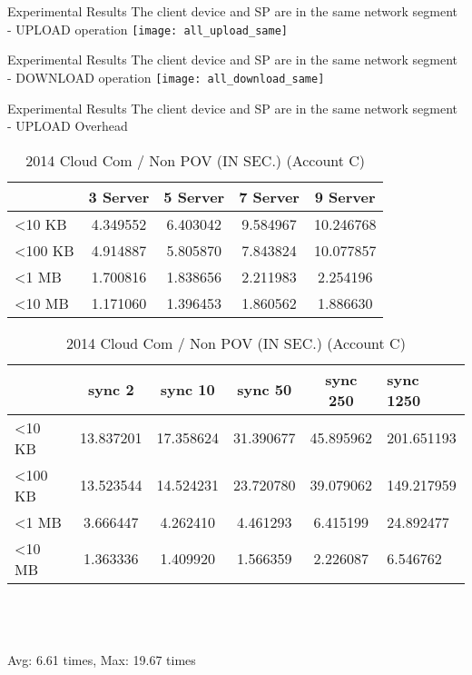 \begin{frame}{Experimental Results}
{The client device and SP are in the same network segment - UPLOAD operation}
	\texttt{[image: all\_upload\_same]}
\end{frame}

\begin{frame}{Experimental Results}
{The client device and SP are in the same network segment - DOWNLOAD operation}
	\texttt{[image: all\_download\_same]}
\end{frame}

\begin{frame}{Experimental Results}
{The client device and SP are in the same network segment - UPLOAD Overhead}
	\scriptsize
    \begin{table}[]
    \centering
    \caption{My Method / Non POV (IN SEC.) (Account C)}
    \begin{tabular}{lcccc}
                         & 3 Server & 5 Server & 7 Server & 9 Server  \\ \hline
        \textless 10 KB  & 4.349552 & 6.403042 & 9.584967 & 10.246768 \\ \hline
        \textless 100 KB & 4.914887 & 5.805870 & 7.843824 & 10.077857 \\ \hline
        \textless 1 MB   & 1.700816 & 1.838656 & 2.211983 & 2.254196  \\ \hline
        \textless 10 MB  & 1.171060 & 1.396453 & 1.860562 & 1.886630  \\ \hline
    \end{tabular}
    \caption{2014 Cloud Com / Non POV (IN SEC.) (Account C)}
    \begin{tabular}{lccccl}
                         & sync 2    & sync 10   & sync 50   & sync 250  & sync 1250  \\ \hline
        \textless 10 KB  & 13.837201 & 17.358624 & 31.390677 & 45.895962 & 201.651193 \\ \hline
        \textless 100 KB & 13.523544 & 14.524231 & 23.720780 & 39.079062 & 149.217959 \\ \hline
        \textless 1 MB   & 3.666447  & 4.262410  & 4.461293  & 6.415199  & 24.892477  \\ \hline
        \textless 10 MB  & 1.363336  & 1.409920  & 1.566359  & 2.226087  & 6.546762   \\ \hline
    \end{tabular}
    ~\\
    ~\\
    ~\\
    \alert{Avg: 6.61 times, Max: 19.67 times}
    \end{table}
\end{frame}

